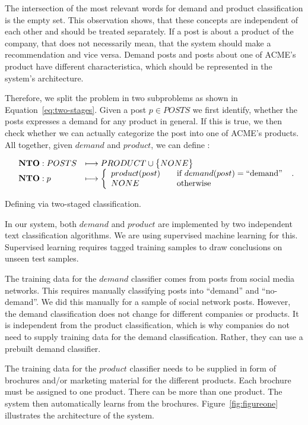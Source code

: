 The intersection of the most relevant words for demand and product classification is the empty set.
This observation shows, that these concepts are independent of each other and should be treated separately.
If a post is about a product of the company, that does not necessarily mean, that the system should make a recommendation and vice versa.
Demand posts and posts about one of ACME's product have different characteristica, which should be represented in the system's architecture.

Therefore, we split the \nto problem in two subproblems as shown in Equation~\ref{eq:two-stages}. Given a post $p \in POSTS$ we first identify, whether the posts expresses a demand for any product in general.
If this is true, we then check whether we can actually categorize the post into one of ACME's products.
All together, given $demand$ and $product$, we can define \nto:


\begin{equationBlock}
	\label{eq:two-stages}
	\[
		\begin{array}{l l}
			\mathbf{NTO}: POSTS & \longmapsto PRODUCT \cup \big\{ NONE \big\} \\
			\mathbf{NTO}: p  & \longmapsto \left\{
				\begin{array}{l l}
				  product(post) & \quad \text{if}~demand(post) = \operatorname{``demand''}\\
				  NONE & \quad \text{otherwise}
				\end{array} \right.
		\end{array} .
	\]
	\caption{Defining \nto via two-staged classification.}
\end{equationBlock}

In our system, both $demand$ and $product$ are implemented by two independent text classification algorithms.
We are using supervised machine learning for this.
Supervised learning requires tagged training samples to draw conclusions on unseen test samples.

The training data for the $demand$ classifier comes from posts from social media networks.
This requires manually classifying posts into ``demand'' and ``no-demand''.
We did this manually for a sample of social network posts.
However, the demand classification does not change for different companies or products.
It is independent from the product classification, which is why companies do not need to supply training data for the demand classification.
Rather, they can use a prebuilt demand classifier.

The training data for the $product$ classifier needs to be supplied in form of brochures and/or marketing material for the different products.
Each brochure must be assigned to one product.
There can be more than one product.
The system then automatically learns from the brochures.
Figure~\ref{fig:figureone} illustrates the architecture of the system.

